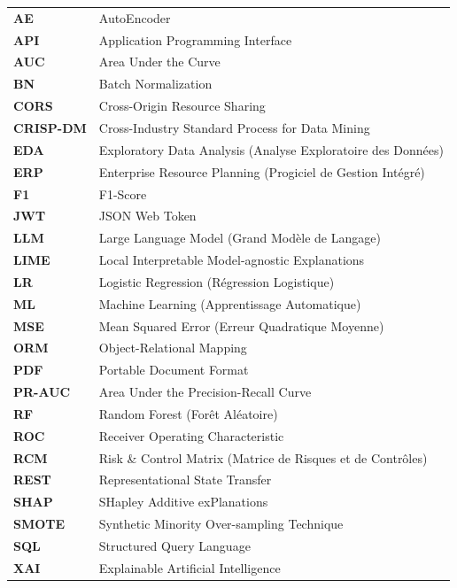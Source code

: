 \documentclass[12pt,a4paper,twoside]{report}
\begin{document}
\begin{tabular}{ll}
  \textbf{AE}       & AutoEncoder \\
  \textbf{API}      & Application Programming Interface \\
  \textbf{AUC}      & Area Under the Curve \\
  \textbf{BN}       & Batch Normalization \\
  \textbf{CORS}     & Cross-Origin Resource Sharing \\
  \textbf{CRISP-DM} & Cross-Industry Standard Process for Data Mining \\
  \textbf{EDA}      & Exploratory Data Analysis (Analyse Exploratoire des Données) \\
  \textbf{ERP}      & Enterprise Resource Planning (Progiciel de Gestion Intégré) \\
  \textbf{F1}       & F1-Score \\
  \textbf{JWT}      & JSON Web Token \\
  \textbf{LLM}      & Large Language Model (Grand Modèle de Langage) \\
  \textbf{LIME}     & Local Interpretable Model-agnostic Explanations \\
  \textbf{LR}       & Logistic Regression (Régression Logistique) \\
  \textbf{ML}       & Machine Learning (Apprentissage Automatique) \\
  \textbf{MSE}      & Mean Squared Error (Erreur Quadratique Moyenne) \\
  \textbf{ORM}      & Object-Relational Mapping \\
  \textbf{PDF}      & Portable Document Format \\
  \textbf{PR-AUC}   & Area Under the Precision-Recall Curve \\
  \textbf{RF}       & Random Forest (Forêt Aléatoire) \\
  \textbf{ROC}      & Receiver Operating Characteristic \\
  \textbf{RCM}      & Risk \& Control Matrix (Matrice de Risques et de Contrôles) \\
  \textbf{REST}     & Representational State Transfer \\
  \textbf{SHAP}     & SHapley Additive exPlanations \\
  \textbf{SMOTE}    & Synthetic Minority Over-sampling Technique \\
  \textbf{SQL}      & Structured Query Language \\
  \textbf{XAI}      & Explainable Artificial Intelligence \\
\end{tabular}
\end{document}
